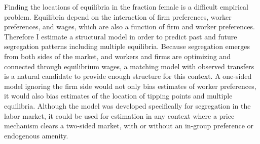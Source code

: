 \documentclass[11pt]{article}
\begin{document}
Finding the locations of equilibria in the fraction female is a difficult empirical problem. Equilibria depend on the interaction of firm preferences, worker preferences, and wages, which are also a function of firm and worker preferences. Therefore I estimate a structural model in order to predict past and future segregation patterns including multiple equilibria. Because segregation emerges from both sides of the market, and workers and firms are optimizing and connected through equilibrium wages, a matching model with observed transfers is a natural candidate to provide enough structure for this context. A one-sided model ignoring the firm side would not only bias estimates of worker preferences, it would also bias estimates of the location of tipping points and multiple equilibria. Although the model was developed specifically for segregation in the labor market, it could be used for estimation in any context where a price mechanism clears a two-sided market, with or without an in-group preference or endogenous amenity. 





\end{document}
